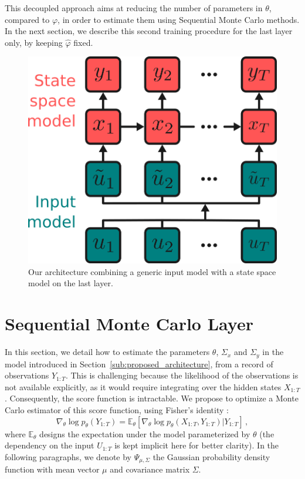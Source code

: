 \documentclass[conference]{IEEEtran}
\begin{document}
This decoupled approach aims at reducing the number of parameters in $\theta$, compared to $\varphi$, in order to estimate them using Sequential Monte Carlo methods.
In the next section, we describe this second training procedure for the last layer only, by keeping $\hat \varphi$ fixed.

\begin{figure}[htpb]
	\centering
	\includegraphics[width=0.5\linewidth]{architecture.png}
	\caption{Our architecture combining a generic input model with a state space model on the last layer.}
	\label{fig:architecture}
\end{figure}

\section{Sequential Monte Carlo Layer}%
\label{sub:uncertainty_estimation}
In this section, we detail how to estimate the parameters $\theta$, $\Sigma_x$ and $\Sigma_y$ in the model introduced in Section~\ref{sub:proposed_architecture}, from a record of observations $Y_{1:T}$.
This is challenging because the likelihood of the observations is not available explicitly, as it would require integrating over the hidden states $X_{1:T}$.
Consequently, the score function is intractable.
We propose to optimize a Monte Carlo estimator of this score function, using Fisher's identity \cite{monographie-randal}:
\begin{equation}
	\nabla_\theta \log p_\theta(Y_{1:T}) = \mathbb{E}_\theta \left[ \nabla_\theta\log p_\theta(X_{1:T}, Y_{1:T}) | Y_{1:T} \right]\,,
	\label{eq:grad_ll}
\end{equation}
where $\mathbb{E}_\theta$ designs the expectation under the model parameterized by $\theta$ (the dependency on the input $U_{1:T}$ is kept implicit here for better clarity).
In the following paragraphs, we denote by $\Psi_{\mu, \Sigma}$ the Gaussian probability density function with mean vector $\mu$ and covariance matrix $\Sigma$.
\end{document}
